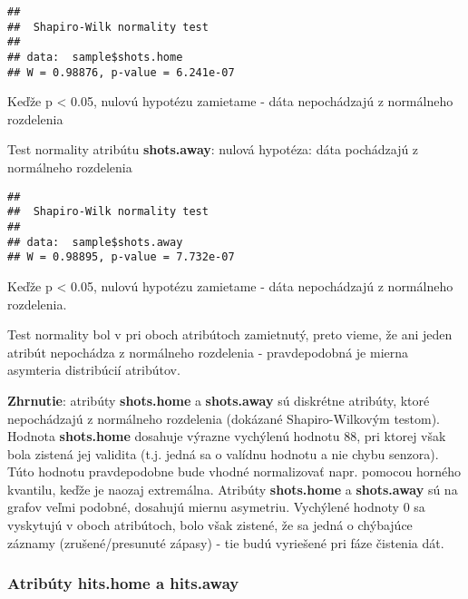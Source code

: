 \documentclass[
]{article}
\newenvironment{Shaded}{\begin{snugshade}}{\end{snugshade}}
\newcommand{\FunctionTok}[1]{\textcolor[rgb]{0.00,0.00,0.00}{#1}}
\newcommand{\NormalTok}[1]{#1}
\newcommand{\SpecialCharTok}[1]{\textcolor[rgb]{0.00,0.00,0.00}{#1}}
\begin{document}
\begin{verbatim}
## 
##  Shapiro-Wilk normality test
## 
## data:  sample$shots.home
## W = 0.98876, p-value = 6.241e-07
\end{verbatim}

Keďže p \textless{} 0.05, nulovú hypotézu zamietame - dáta nepochádzajú
z normálneho rozdelenia

Test normality atribútu \textbf{shots.away}: nulová hypotéza: dáta
pochádzajú z normálneho rozdelenia

\begin{Shaded}
\end{Shaded}

\begin{verbatim}
## 
##  Shapiro-Wilk normality test
## 
## data:  sample$shots.away
## W = 0.98895, p-value = 7.732e-07
\end{verbatim}

Keďže p \textless{} 0.05, nulovú hypotézu zamietame - dáta nepochádzajú
z normálneho rozdelenia.

Test normality bol v pri oboch atribútoch zamietnutý, preto vieme, že
ani jeden atribút nepochádza z normálneho rozdelenia - pravdepodobná je
mierna asymteria distribúcií atribútov.

\textbf{Zhrnutie}: atribúty \textbf{shots.home} a \textbf{shots.away} sú
diskrétne atribúty, ktoré nepochádzajú z normálneho rozdelenia (dokázané
Shapiro-Wilkovým testom). Hodnota \textbf{shots.home} dosahuje výrazne
vychýlenú hodnotu 88, pri ktorej však bola zistená jej validita (t.j.
jedná sa o valídnu hodnotu a nie chybu senzora). Túto hodnotu
pravdepodobne bude vhodné normalizovať napr. pomocou horného kvantilu,
keďže je naozaj extremálna. Atribúty \textbf{shots.home} a
\textbf{shots.away} sú na grafov veľmi podobné, dosahujú miernu
asymetriu. Vychýlené hodnoty 0 sa vyskytujú v oboch atribútoch, bolo
však zistené, že sa jedná o chýbajúce záznamy (zrušené/presunuté zápasy)
- tie budú vyriešené pri fáze čistenia dát.

\hypertarget{atribuxfaty-hits.home-a-hits.away}{%
\subsubsection{Atribúty hits.home a
hits.away}\label{atribuxfaty-hits.home-a-hits.away}}
\end{document}
